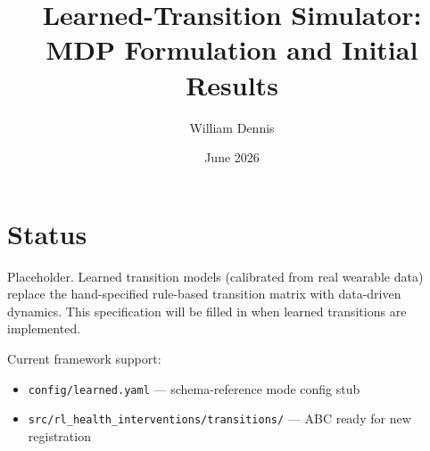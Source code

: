 \documentclass[11pt]{article}
\title{Learned-Transition Simulator: MDP Formulation and Initial Results}
\author{William Dennis}
\date{June 2026}
\begin{document}
\maketitle

\section*{Status}

Placeholder. Learned transition models (calibrated from real wearable data)
replace the hand-specified rule-based transition matrix with data-driven
dynamics. This specification will be filled in when learned transitions
are implemented.

Current framework support:
\begin{itemize}
  \item \texttt{config/learned.yaml} — schema-reference mode config stub
  \item \texttt{src/rl\_health\_interventions/transitions/} — ABC ready for new registration
\end{itemize}
\end{document}
